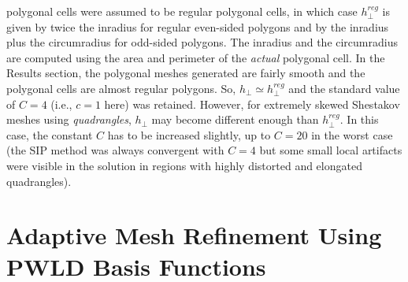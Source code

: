 \documentclass[preprint,10pt]{elsarticle}
\newcommand{\reg}{\textit{reg}}
\begin{document}
polygonal cells were assumed to be regular polygonal cells, in which case $h_{\bot}^\reg$ is given
by twice the inradius for regular even-sided polygons and by the inradius plus the 
circumradius for odd-sided polygons. The inradius and the circumradius are computed 
using the area and perimeter of the {\it actual} polygonal cell. 
%
In the Results section, the polygonal meshes generated are fairly smooth and the polygonal cells are almost regular polygons. So, $h_\perp \simeq h^{reg}_\perp$ and the standard value of $C=4$ (i.e., $c=1$ here) was retained. 
%
However, for extremely skewed Shestakov meshes using {\it quadrangles}, $h_\perp $ may become different enough than $h^{reg}_\perp$. In this case, the constant $C$ has to be increased slightly, up to $C=20$ in the worst case (the SIP method was always convergent with $C=4$ but some small local artifacts were visible in the solution in regions with highly distorted and elongated quadrangles).





\section{Adaptive Mesh Refinement Using PWLD Basis Functions} \label{sec:amr}
\end{document}
